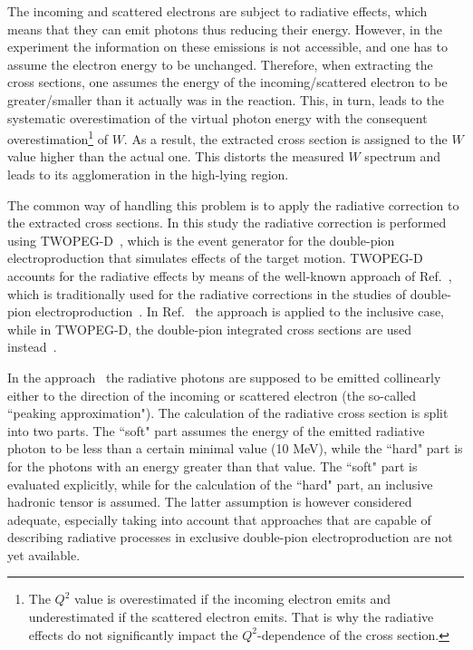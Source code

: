 The incoming and scattered electrons are subject to radiative effects, which means that they can emit photons thus reducing their energy. However, in the experiment the information on these emissions is not accessible, and one has to assume the electron energy to be unchanged. Therefore, when extracting the cross sections, one assumes the energy of the incoming/scattered electron to be greater/smaller than it actually was in the reaction. This, in turn, leads to the systematic overestimation of the virtual photon energy with the consequent overestimation\footnote[2]{The $Q^2$ value is overestimated if the incoming electron emits and underestimated if the scattered electron emits. That is why the radiative effects do not significantly impact the $Q^{2}$-dependence of the cross section.} of $W$. As a result, the extracted cross section is assigned to the $W$ value higher than the actual one. This distorts the measured $W$ spectrum and leads to its agglomeration in the high-lying region.


The common way of handling this problem is to apply the radiative correction to the extracted cross sections. In this study the radiative correction is performed using TWOPEG-D~\cite{twopeg-d}, which is the event generator for the double-pion electroproduction that simulates effects of the target motion. TWOPEG-D accounts for the radiative effects by means of the well-known approach of Ref.~\cite{Mo:1968cg}, which is traditionally used for the radiative corrections in the studies of double-pion electroproduction~\cite{Rip_an_note:2002,Ripani:2002ss,Fed_an_note:2007,Fedotov:2008aa,Fed_an_note:2017,Fed_paper_2018,Isupov:2017lnd,Arjun}. In Ref.~\cite{Mo:1968cg} the approach is applied to the inclusive case, while in TWOPEG-D, the double-pion integrated cross sections are used instead~\cite{twopeg,twopeg-d}. 

In the approach~\cite{Mo:1968cg,twopeg,twopeg-d} the radiative photons are supposed to be emitted collinearly either to the direction of the incoming or scattered electron (the so-called ``peaking approximation"). The calculation of the radiative cross section is split into two parts. The ``soft" part assumes the energy of the emitted radiative photon to be less than a certain minimal value (10 MeV), while the ``hard" part is for the photons with an energy greater than that value. The ``soft" part is evaluated explicitly, while for the calculation of the ``hard" part, an inclusive hadronic tensor is assumed. The latter assumption is however considered adequate, especially taking into account that approaches that are capable of describing radiative processes in exclusive double-pion electroproduction are not yet available.


